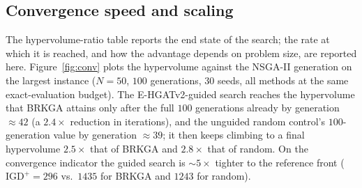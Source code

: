 \documentclass[11pt]{article}
\begin{document}
\subsection{Convergence speed and scaling}
\label{sec:scaling}
The hypervolume-ratio table reports the end state of the search; the rate at which it is
reached, and how the advantage depends on problem size, are reported here.
Figure~\ref{fig:conv} plots the hypervolume against the NSGA-II
generation on the largest instance ($N{=}50$, $100$ generations, $30$ seeds, all methods at
the same exact-evaluation budget). The E-HGATv2-guided search reaches the hypervolume that
BRKGA attains only after the full $100$ generations already by generation
$\approx\!42$ (a $2.4\times$ reduction in iterations), and the unguided random control's
$100$-generation value by generation $\approx\!39$; it then keeps climbing to a final
hypervolume $2.5\times$ that of BRKGA and $2.8\times$ that of random. On the convergence
indicator the guided search is $\sim\!5\times$ tighter to the reference front
($\mathrm{IGD}^+ = 296$ vs.\ $1435$ for BRKGA and $1243$ for random).
\end{document}
